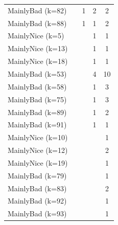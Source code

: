 \documentclass[journal,10pt,twoside]{IEEEtran}
\begin{document}
\begin{table}[ht]
\begin{minipage}{.35\textwidth}
\begin{tabular}{l|cccc}
        MainlyBad (k=82)     &      &    1 &    2 &    2 \\
        MainlyBad (k=88)     &      &    1 &    1 &    2 \\
        MainlyNice (k=5)     &      &      &    1 &    1 \\
        MainlyNice (k=13)    &      &      &    1 &    1 \\
        MainlyNice (k=18)    &      &      &    1 &    1 \\
        MainlyBad (k=53)     &      &      &    4 &   10 \\
        MainlyBad (k=58)     &      &      &    1 &    3 \\
        MainlyBad (k=75)     &      &      &    1 &    3 \\
        MainlyBad (k=89)     &      &      &    1 &    2 \\
        MainlyBad (k=91)     &      &      &    1 &    1 \\
        MainlyNice (k=10)    &      &      &      &    1 \\
        MainlyNice (k=12)    &      &      &      &    2 \\
        MainlyNice (k=19)    &      &      &      &    1 \\
        MainlyBad (k=79)     &      &      &      &    1 \\
        MainlyBad (k=83)     &      &      &      &    2 \\
        MainlyBad (k=92)     &      &      &      &    1 \\
        MainlyBad (k=93)     &      &      &      &    1 \\ \bottomrule
    \end{tabular}
    \end{minipage}
\end{table}
\end{document}
